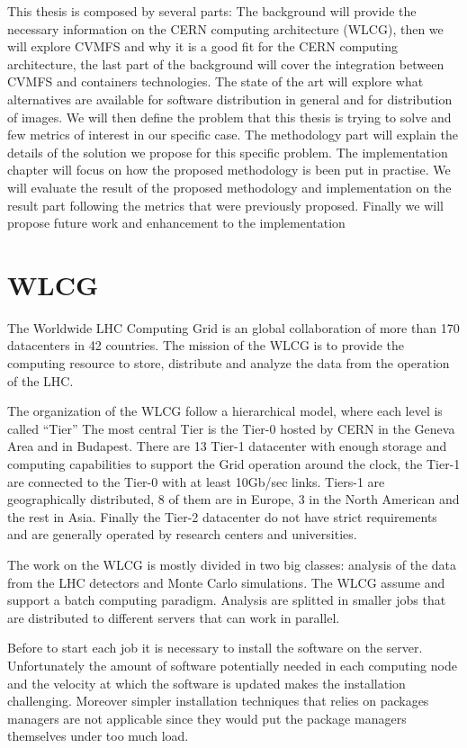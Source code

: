 This thesis is composed by several parts:
The background will provide the necessary information on the CERN computing architecture (WLCG), then we will explore CVMFS and why it is a good fit for the CERN computing architecture, the last part of the background will cover the integration between CVMFS and containers technologies.
The state of the art will explore what alternatives are available for software distribution in general and for distribution of images.
We will then define the problem that this thesis is trying to solve and few metrics of interest in our specific case.
The methodology part will explain the details of the solution we propose for this specific problem.
The implementation chapter will focus on how the proposed methodology is been put in practise.
We will evaluate the result of the proposed methodology and implementation on the result part following the metrics that were previously proposed.
Finally we will propose future work and enhancement to the implementation


\section{WLCG}

The Worldwide LHC Computing Grid is an global collaboration of more than 170 datacenters in 42 countries.
The mission of the WLCG is to provide the computing resource to store, distribute and analyze the data from the operation of the LHC.

The organization of the WLCG follow a hierarchical model, where each level is called “Tier”
The most central Tier is the Tier-0 hosted by CERN in the Geneva Area and in Budapest. There are 13 Tier-1 datacenter with enough storage and computing capabilities to support the Grid operation around the clock, the Tier-1 are connected to the Tier-0 with at least 10Gb/sec links. 
Tiers-1 are geographically distributed, 8 of them are in Europe, 3 in the North American and the rest in Asia. Finally the Tier-2 datacenter do not have strict requirements and are generally operated by research centers and universities.

The work on the WLCG is mostly divided in two big classes: analysis of the data from the LHC detectors and Monte Carlo simulations.
The WLCG assume and support a batch computing paradigm. Analysis are splitted in smaller jobs that are distributed to different servers that can work in parallel.

Before to start each job it is necessary to install the software on the server. Unfortunately the amount of software potentially needed in each computing node and the velocity at which the software is updated makes the installation challenging. Moreover simpler installation techniques that relies on packages managers are not applicable since they would put the package managers themselves under too much load.

